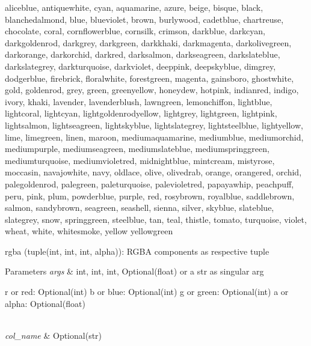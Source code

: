aliceblue, antiquewhite, cyan, aquamarine, azure, beige, bisque, black, blanchedalmond, blue, blueviolet, brown, burlywood, cadetblue, chartreuse, chocolate, coral, cornflowerblue, cornsilk, crimson, darkblue, darkcyan, darkgoldenrod, darkgrey, darkgreen, darkkhaki, darkmagenta, darkolivegreen, darkorange, darkorchid, darkred, darksalmon, darkseagreen, darkslateblue, darkslategrey, darkturquoise, darkviolet, deeppink, deepskyblue, dimgrey, dodgerblue, firebrick, floralwhite, forestgreen, magenta, gainsboro, ghostwhite, gold, goldenrod, grey, green, greenyellow, honeydew, hotpink, indianred, indigo, ivory, khaki, lavender, lavenderblush, lawngreen, lemonchiffon, lightblue, lightcoral, lightcyan, lightgoldenrodyellow, lightgrey, lightgreen, lightpink, lightsalmon, lightseagreen, lightskyblue, lightslategrey, lightsteelblue, lightyellow, lime, limegreen, linen, maroon, mediumaquamarine, mediumblue, mediumorchid, mediumpurple, mediumseagreen, mediumslateblue, mediumspringgreen, mediumturquoise, mediumvioletred, midnightblue, mintcream, mistyrose, moccasin, navajowhite, navy, oldlace, olive, olivedrab, orange, orangered, orchid, palegoldenrod, palegreen, paleturquoise, palevioletred, papayawhip, peachpuff, peru, pink, plum, powderblue, purple, red, rosybrown, royalblue, saddlebrown, salmon, sandybrown, seagreen, seashell, sienna, silver, skyblue, slateblue, slategrey, snow, springgreen, steelblue, tan, teal, thistle, tomato, turquoise, violet, wheat, white, whitesmoke, yellow yellowgreen

\begin{DoxyVerb}    rgba (tuple(int, int, int, alpha)): RGBA components as respective tuple
\end{DoxyVerb}



\begin{DoxyParams}{Parameters}
{\em args} & int, int, int, Optional(float) or a str as singular arg \begin{DoxyVerb}        r or red: Optional(int)
        b or blue: Optional(int)
        g or green: Optional(int)
        a or alpha: Optional(float)
\end{DoxyVerb}
 \\
\hline
{\em col\+\_\+name} & Optional(str)\\
\hline
\end{DoxyParams}

